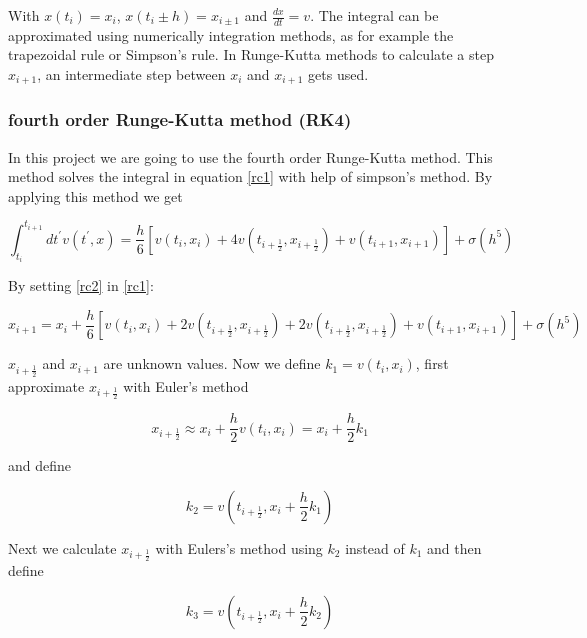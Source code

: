 \documentclass[10pt,a4paper]{article}
\begin{document}
With $x(t_i) = x_i$, $x(t_i \pm h) = x_{i \pm 1}$ and $\frac{dx}{dt} = v$. The integral can be approximated using numerically integration methods, as for example the trapezoidal rule or Simpson's rule. In Runge-Kutta methods to calculate a step $x_{i+1}$, an intermediate step between $x_i$ and $x_{i+1}$ gets used.

\subsubsection{fourth order Runge-Kutta method (RK4)}
\label{subsubsec:rc4}

In this project we are going to use the fourth order Runge-Kutta method. This method solves the integral in equation \eqref{rc1} with help of simpson's method. By applying this method we get

\begin{equation}
\label{rc2}
\int_{t_i}^{t_{i+1}} dt^{'} v(t^{'}, x) = \frac{h}{6} [v(t_i, x_i) +4 v(t_{i+\frac{1}{2}}, x_{i+\frac{1}{2}}) + v(t_{i+1}, x_{i+1})] + \sigma(h^5)
\end{equation}

By setting \eqref{rc2} in \eqref{rc1}:

\begin{equation}
\label{rc3}
x_{i+1} = x_i + \frac{h}{6} [v(t_i, x_i) + 2 v(t_{i+\frac{1}{2}}, x_{i+\frac{1}{2}}) + 2 v(t_{i+\frac{1}{2}}, x_{i+\frac{1}{2}}) + v(t_{i+1}, x_{i+1})] + \sigma(h^5)
\end{equation}

$x_{i+\frac{1}{2}}$ and $x_{i+1}$ are unknown values. Now we define $k_1 = v(t_i, x_i)$, first approximate $x_{i+\frac{1}{2}}$ with Euler's method

\begin{equation}
\label{s:rc4}
x_{i+\frac{1}{2}} \approx x_i + \frac{h}{2} v(t_i, x_i) = x_i + \frac{h}{2} k_1
\end{equation}

and define

\begin{equation}
\label{rc5}
k_2 = v(t_{i+\frac{1}{2}}, x_i + \frac{h}{2} k_1)
\end{equation}

Next we calculate $x_{i + \frac{1}{2}}$ with Eulers's method using $k_2$ instead of $k_1$ and then define

\begin{equation}
\label{rc6}
k_3 =  v(t_{i+\frac{1}{2}}, x_i+\frac{h}{2} k_2)
\end{equation}
\end{document}
